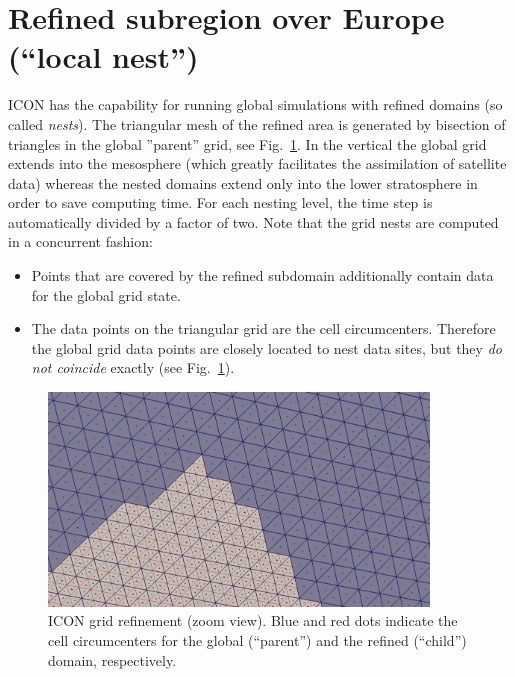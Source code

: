 \section{Refined subregion over Europe (``local nest'')}

ICON has the capability for running global simulations with refined
domains (so called \emph{nests}).
%
The triangular mesh of the refined area is generated by bisection of
triangles in the global ''parent'' grid, see
Fig.~\ref{fig:icon_grid_refinement_zoom_view}.
In the vertical the global grid extends into the mesosphere (which
greatly facilitates the assimilation of satellite data) whereas the
nested domains extend only into the lower stratosphere in order to
save computing time.
For each nesting level, the time step is automatically divided by a
factor of two.
%
Note that the grid nests are computed in a concurrent fashion:  
\begin{itemize}
\item Points that are covered by the refined subdomain additionally
  contain data for the global grid state.
\item The data points on the triangular grid are the cell
  circumcenters. Therefore the global grid data points are closely
  located to nest data sites, but they \emph{do not coincide} exactly 
  (see Fig.~\ref{fig:icon_grid_refinement_zoom_view}).
\end{itemize}


\begin{figure}[h]
  \centering
  \includegraphics[width=0.90\textwidth]{pics/grid_refinement.png}
  \caption{ICON grid refinement (zoom view). Blue and red dots indicate the cell circumcenters for the global (``parent'') and the refined (``child'') domain, respectively.}
  \label{fig:icon_grid_refinement_zoom_view}
\end{figure}

